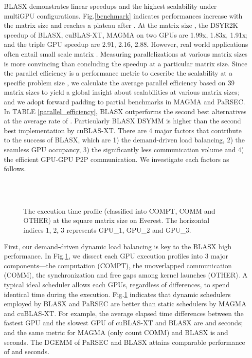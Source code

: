 \documentclass[conference]{IEEEtran}
\begin{document}
BLASX demonstrates linear speedups and the highest scalability under multiGPU configurations.
Fig.\ref{benchmark} indicates performances increase with the matrix size and reaches a plateau 
after . At the matrix size , the DSYR2K speedup of 
BLASX, cuBLAS-XT, MAGMA on two GPUs are 1.99x, 1.83x, 1.91x; and the triple GPU speedup are 
2.91, 2.16, 2.88. However, real world applications often entail small scale matrix
. Measuring parallelizations at various matrix sizes is more convincing than
concluding the speedup at a particular matrix size. Since the parallel efficiency is a 
performance metric to describe the scalability at a specific problem size ,
we calculate the average parallel efficiency based on 39 matrix sizes  
to yield a global insight about scalabilities at various matrix sizes; and we adopt forward
padding to partial benchmarks in MAGMA and PaRSEC. In TABLE \ref{parallel_efficiency}, 
BLASX outperforms the second 
best alternatives at the average rate of . Particularly BLASX DSYMM is  
higher than the second best implementation by cuBLAS-XT. There are 4 major factors that contribute
to the success of BLASX, which are 1) the demand-driven load balancing, 2) the seamless 
GPU occupancy, 3) the significantly less communication volume and 4) the efficient GPU-GPU 
P2P communication. We investigate each factors as follows.

\begin{figure}[!t]
\centering
{}
\hfil
{}
\\
\hfil
{}
\\
\hfil
{}
\caption{The execution time profile (classified into COMPT, COMM and OTHER) at the square matrix size  on Everest. 
The horizontal indices 1, 2, 3 represents GPU\_1, GPU\_2 and GPU\_3.}
\label{time_profile}
\vspace{-0.3in}
\end{figure}


First, our demand-driven dynamic load balancing is key to the BLASX high performance.
In Fig.\ref{time_profile}, we dissect each GPU execution profiles into 3 major
components---the computation (COMPT), the unoverlapped communication (COMM), the 
synchronization and free gaps among kernel launches (OTHER). A typical ideal scheduler 
allows each GPUs, regardless of differences, to spend identical time during the execution. 
Fig.\ref{time_profile} indicates that dynamic schedulers employed by BLASX and PaRSEC 
are better than static schedulers by MAGMA and cuBLAS-XT. For example, the average elapsed time
differences between the fastest GPU and the slowest GPU of cuBLAS-XT and BLASX are 
and  seconds; and the same metric for MAGMA (only count COMM) and BLASX is  
and  seconds. The DGEMM of PaRSEC and BLASX attains comparable performance of  
and  seconds.
\end{document}
